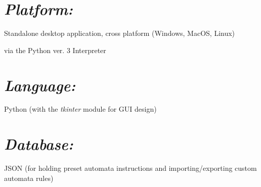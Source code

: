 \documentclass[12pt]{article}
\begin{document}
\begin{FlushLeft}
		\section*{\textit{Platform:}}
		Standalone desktop application, cross platform (Windows, MacOS, Linux)

		via the Python ver. 3 Interpreter

		\section*{\textit{Language:}}
		Python (with the \textit{tkinter} module for GUI design)

		\section*{\textit{Database:}}
		JSON (for holding preset automata instructions and importing/exporting custom automata rules)
	\end{FlushLeft}
\end{document}

